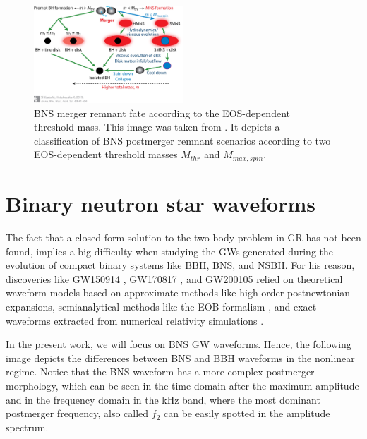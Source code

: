 \begin{figure}[hbt!]
\begin{center}
\includegraphics[width=0.5\textwidth, angle=0]{images/shi.jpeg}
\captionsetup{width=0.8\textwidth}
\caption[BNS merger remnant fate according to the EOS-dependent threshold mass]{BNS merger remnant fate according to the EOS-dependent threshold mass. This image was taken from \cite{Shibata:2019wef}. It depicts a classification of BNS postmerger remnant scenarios according to two EOS-dependent threshold masses $M_{thr}$ and $M_{max,spin}$.}
\label{BNS-out}
\end{center}
\end{figure}
\FloatBarrier

\newpage

\section{Binary neutron star waveforms}

The fact that a closed-form solution to the two-body problem in GR has not been found, implies a big difficulty when studying the GWs generated during the evolution of compact binary systems like BBH, BNS, and NSBH. For his reason, discoveries like GW150914 \cite{LIGOScientific:2016aoc}, GW170817 \cite{LIGOScientific:2017vwq}, and GW200105 \cite{LIGOScientific:2021qlt} relied on theoretical waveform models based on approximate methods like high order postnewtonian expansions, semianalytical methods like the  EOB formalism \cite{PhysRevD.96.121501,Dietrich:2018uni}, and exact waveforms extracted from numerical relativity simulations \cite{Bishop:2016lgv}.


In the present work, we will focus on BNS GW waveforms. Hence, the following image depicts the differences between BNS and BBH waveforms in the nonlinear regime. Notice that the BNS waveform has a more complex postmerger morphology, which can be seen in the time domain after the maximum amplitude and in the frequency domain in the kHz band, where the most dominant postmerger frequency, also called $f_2$ can be easily spotted in the amplitude spectrum. 


